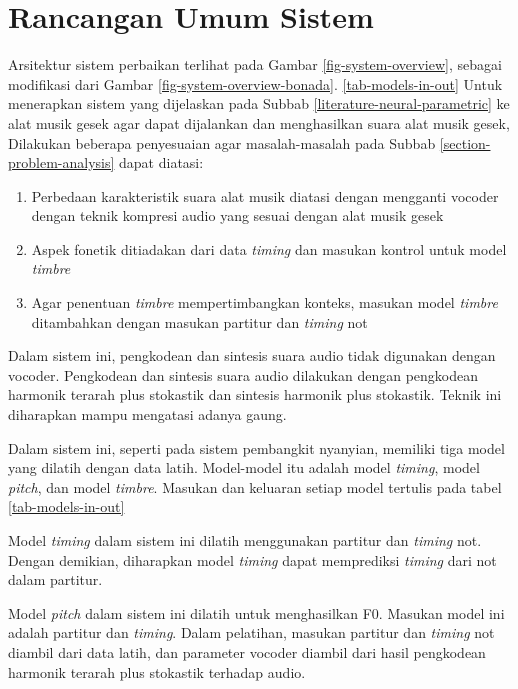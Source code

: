 \section{Rancangan Umum Sistem}

Arsitektur sistem perbaikan terlihat pada Gambar \ref{fig-system-overview}, sebagai modifikasi dari Gambar \ref{fig-system-overview-bonada}. \ref{tab-models-in-out} Untuk menerapkan sistem yang dijelaskan pada Subbab \ref{literature-neural-parametric} ke alat musik gesek agar dapat dijalankan dan menghasilkan suara alat musik gesek, Dilakukan beberapa penyesuaian agar masalah-masalah pada Subbab \ref{section-problem-analysis} dapat diatasi:

\begin{enumerate}

    \item Perbedaan karakteristik suara alat musik diatasi dengan mengganti vocoder dengan teknik kompresi audio yang sesuai dengan alat musik gesek
    \item Aspek fonetik ditiadakan dari data \textit{timing} dan masukan kontrol untuk model \textit{timbre}
    \item Agar penentuan \textit{timbre} mempertimbangkan konteks, masukan model \textit{timbre} ditambahkan dengan masukan partitur dan \textit{timing} not

\end{enumerate}

Dalam sistem ini, pengkodean dan sintesis suara audio tidak digunakan dengan vocoder. Pengkodean dan sintesis suara audio dilakukan dengan pengkodean harmonik terarah plus stokastik dan sintesis harmonik plus stokastik. Teknik ini diharapkan mampu mengatasi adanya gaung.

Dalam sistem ini, seperti pada sistem pembangkit nyanyian, memiliki tiga model yang dilatih dengan data latih. Model-model itu adalah model \textit{timing}, model \textit{pitch}, dan model \textit{timbre}. Masukan dan keluaran setiap model tertulis pada tabel \ref{tab-models-in-out}

Model \textit{timing} dalam sistem ini dilatih menggunakan partitur dan \textit{timing} not. Dengan demikian, diharapkan model \textit{timing} dapat memprediksi \textit{timing} dari not dalam partitur.

Model \textit{pitch} dalam sistem ini dilatih untuk menghasilkan F0. Masukan model ini adalah partitur dan \textit{timing}. Dalam pelatihan, masukan partitur dan \textit{timing} not diambil dari data latih, dan parameter vocoder diambil dari hasil pengkodean harmonik terarah plus stokastik terhadap audio.

